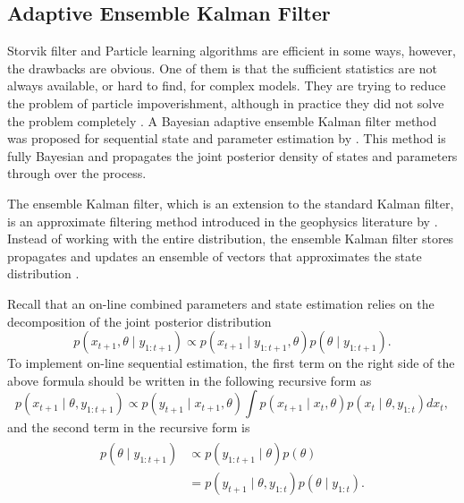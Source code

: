 \subsection{Adaptive Ensemble Kalman Filter}

Storvik filter and Particle learning algorithms are efficient in some ways,  however, the drawbacks are obvious. One of them is that the sufficient statistics are not always available, or hard to find, for complex models. They are trying to reduce the problem of particle impoverishment, although in practice they did not solve the problem completely \citep{chopin2010particle}. A Bayesian adaptive ensemble Kalman filter method was proposed for sequential state and parameter estimation by \cite{stroud2016bayesian}. This method is fully Bayesian and propagates the joint posterior density of states and parameters through over the process. 


The ensemble Kalman filter, which is an extension to the standard Kalman filter, is an approximate filtering method introduced in the geophysics literature by \cite{evensen1994sequential}. Instead of working with the entire distribution, the ensemble Kalman filter stores propagates and updates an ensemble of vectors that approximates the state distribution \citep{katzfuss2016understanding}. 


Recall that an on-line combined parameters and state estimation relies on the decomposition of the joint posterior distribution 
\begin{equation*}\label{jointposterior}
p(x_{t+1},\theta \mid y_{1:t+1}) \propto p(x_{t+1}\mid y_{1:t+1},\theta)p(\theta\mid y_{1:t+1}).
\end{equation*}
To implement on-line sequential estimation, the first term on the right side of the above formula should be written in the following recursive form as 
\begin{equation}\label{jointposteriorterm1}
p(x_{t+1}\mid \theta, y_{1:t+1}) \propto p(y_{t+1}\mid x_{t+1},\theta) \int p(x_{t+1}\mid x_{t},\theta) p(x_{t}\mid \theta, y_{1:t})dx_{t},
\end{equation}
and the second term in the recursive form is 
\begin{align}\label{jointposteriorterm2}
\begin{split}
p(\theta\mid y_{1:t+1}) & \propto p( y_{1:t+1}\mid\theta)p(\theta) \\
&= p(y_{t+1}\mid\theta,y_{1:t})p(\theta\mid y_{1:t}).
\end{split}
\end{align}


